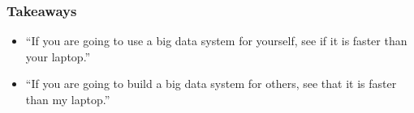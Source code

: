 \begin{frame}
\frametitle{Takeaways}

\Large
\begin{changemargin}{1cm}

\begin{itemize}
\item    ``If you are going to use a big data system for yourself, see if it is faster than your laptop.''\\[1em]
\item    ``If you are going to build a big data system for others, see that it is faster than my laptop.''
\end{itemize}

\end{changemargin}
\end{frame}




